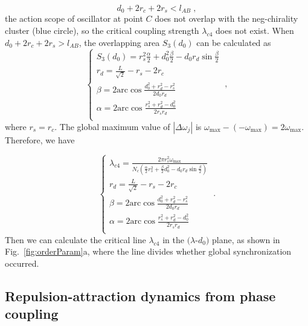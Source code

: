 \documentclass[%
 aip,
 amsmath,amssymb,
 reprint,%
]{revtex4-1}
\begin{document}
\begin{equation}
    d_0+2r_c+2r_s<l_{AB}\;,
\end{equation}
the action scope of oscillator at point $C$ does not overlap with the neg-chirality cluster (blue circle), so the critical coupling strength $\lambda_{c4}$ does not exist. When $d_0+2r_c+2r_s>l_{AB}$, the overlapping area $S_3\left( d_0 \right)$ can be calculated as
\begin{equation}
    \begin{cases}
        S_3\left( d_0 \right) =r_{s}^{2}\frac{\alpha}{2}+d_{0}^{2}\frac{\beta}{2}-d_0r_d\sin \frac{\beta}{2}\\
        r_d=\frac{L}{\sqrt{2}}-r_s-2r_c\\
        \beta =2\mathrm{arc}\cos \frac{d_{0}^{2}+r_{d}^{2}-r_{s}^{2}}{2d_0r_d}\\
        \alpha =2\mathrm{arc}\cos \frac{r_{s}^{2}+r_{d}^{2}-d_{0}^{2}}{2r_sr_d}\\
    \end{cases}\;,
\end{equation}
where $r_s=r_c$. The global maximum value of $\left| \Delta \omega _j \right|$ is $\omega _{\max}-\left( -\omega _{\max} \right) =2\omega _{\max}$. Therefore, we have

\begin{equation}
    \begin{cases}
        \lambda _{c4}=\frac{2\pi r_{s}^{2}\omega _{\max}}{N_c\left( \frac{\alpha}{2}r_{s}^{2}+\frac{\beta}{2}d_{0}^{2}-d_0r_d\sin \frac{\beta}{2} \right)}\\
        r_d=\frac{L}{\sqrt{2}}-r_s-2r_c\\
        \beta =2\mathrm{arc}\cos \frac{d_{0}^{2}+r_{d}^{2}-r_{s}^{2}}{2d_0r_d}\\
        \alpha =2\mathrm{arc}\cos \frac{r_{s}^{2}+r_{d}^{2}-d_{0}^{2}}{2r_sr_d}\\
    \end{cases}\;.
\end{equation}
Then we can calculate the critical line $\lambda_{c4}$ in the $(\lambda$-$d_0)$ plane, as shown in Fig.~\ref{fig:orderParam}a, where the line divides whether global synchronization occurred. 

\subsection{Repulsion-attraction dynamics from phase coupling}
\end{document}
